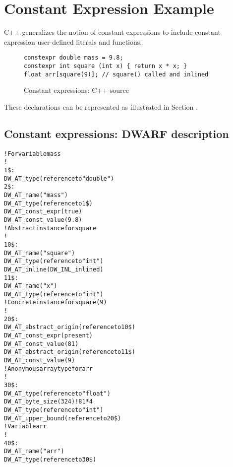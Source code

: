\section{Constant Expression Example}
\label{app:constantexpressionexample}
C++ generalizes the notion of constant expressions to include
constant expression user-defined literals and functions.

\begin{figure}[here]
\begin{lstlisting}
constexpr double mass = 9.8;
constexpr int square (int x) { return x * x; }
float arr[square(9)]; // square() called and inlined
\end{lstlisting}
\caption{Constant expressions: C++ source} \label{fig:constantexpressionscsource}
\end{figure}

These declarations can be represented as illustrated in 
Section .

\subsection{Constant expressions: DWARF description}
\label{app:constantexpressionsdwarfdescription}
\begin{alltt}

      ! For variable mass
      !
1\$:  
        DW\_AT\_type(reference to "double")
2\$:  
        DW\_AT\_name("mass")
        DW\_AT\_type(reference to 1\$)
        DW\_AT\_const\_expr(true)
        DW\_AT\_const\_value(9.8)
      ! Abstract instance for square
      !
10\$: 
        DW\_AT\_name("square")
        DW\_AT\_type(reference to "int")
        DW\_AT\_inline(DW\_INL\_inlined)
11\$:   
            DW\_AT\_name("x")
            DW\_AT\_type(reference to "int")
      ! Concrete instance for square(9)
      !
20\$: 
        DW\_AT\_abstract\_origin(reference to 10\$)
        DW\_AT\_const\_expr(present)
        DW\_AT\_const\_value(81)
            DW\_AT\_abstract\_origin(reference to 11\$)
            DW\_AT\_const\_value(9)
      ! Anonymous array type for arr
      !
30\$: 
        DW\_AT\_type(reference to "float")
        DW\_AT\_byte\_size(324) ! 81*4
            DW\_AT\_type(reference to "int")
            DW\_AT\_upper\_bound(reference to 20\$)
      ! Variable arr
      !
40\$: 
        DW\_AT\_name("arr")
        DW\_AT\_type(reference to 30\$)
\end{alltt}


